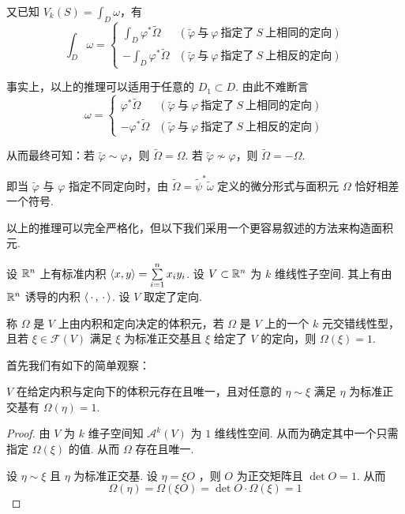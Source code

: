 又已知 $V_k(S)=\displaystyle\int_D\omega$，有
$$
\int_D\omega=\begin{cases}
    \displaystyle\int_{D}\varphi^*\widetilde{\Omega} & (\widetilde{\varphi}~\text{与}~\varphi~\text{指定了}~S~\text{上相同的定向})\\
    \displaystyle-\int_{D}\varphi^*\widetilde{\Omega} & (\widetilde{\varphi}~\text{与}~\varphi~\text{指定了}~S~\text{上相反的定向})
\end{cases}
$$

事实上，以上的推理可以适用于任意的 $D_1\subset D$. 由此不难断言
$$
\omega=\begin{cases}
    \displaystyle\varphi^*\widetilde{\Omega} & (\widetilde{\varphi}~\text{与}~\varphi~\text{指定了}~S~\text{上相同的定向})\\
    \displaystyle-\varphi^*\widetilde{\Omega} & (\widetilde{\varphi}~\text{与}~\varphi~\text{指定了}~S~\text{上相反的定向})
\end{cases}
$$

从而最终可知：若 $\widetilde{\varphi}\sim\varphi$，则 $\widetilde{\Omega}=\Omega$. 若 $\widetilde{\varphi}\not\sim\varphi$，则 $\widetilde{\Omega}=-\Omega$.

即当 $\widetilde{\varphi}$ 与 $\varphi$ 指定不同定向时，由 $\widetilde{\Omega}=\widetilde{\psi}^*\widetilde{\omega}$ 定义的微分形式与面积元 $\Omega$ 恰好相差一个符号.

以上的推理可以完全严格化，但以下我们采用一个更容易叙述的方法来构造面积元.



设 $\mathbb{R}^n$ 上有标准内积 $\left\langle{x,y}\right\rangle=\sum\limits_{i=1}^nx_iy_i$. 设 $V\subset\mathbb{R}^n$ 为 $k$ 维线性子空间. 其上有由 $\mathbb{R}^n$ 诱导的内积 $\left\langle{\,\cdot\,,\,\cdot\,}\right\rangle$. 设 $V$ 取定了定向.

称 $\Omega$ 是 $V$ 上由内积和定向决定的体积元，若 $\Omega$ 是 $V$ 上的一个 $k$ 元交错线性型，且若 $\xi\in\mathscr{F}(V)$ 满足 $\xi$ 为标准正交基且 $\xi$ 给定了 $V$ 的定向，则 $\Omega(\xi)=1$.

首先我们有如下的简单观察：

\begin{property}
    $V$ 在给定内积与定向下的体积元存在且唯一，且对任意的 $\eta\sim\xi$ 满足 $\eta$ 为标准正交基有 $\Omega(\eta)=1$.
\end{property}
\begin{proof}
    由 $V$ 为 $k$ 维子空间知 $\mathscr{A}^k(V)$ 为 $1$ 维线性空间. 从而为确定其中一个只需指定 $\Omega(\xi)$ 的值. 从而 $\Omega$ 存在且唯一.

    设 $\eta\sim\xi$ 且 $\eta$ 为标准正交基. 设 $\eta=\xi O$ ，则 $O$ 为正交矩阵且 $\det O=1$. 从而
$$
\Omega(\eta)=\Omega(\xi O)=\det O\cdot\Omega(\xi)=1
$$
\end{proof}

